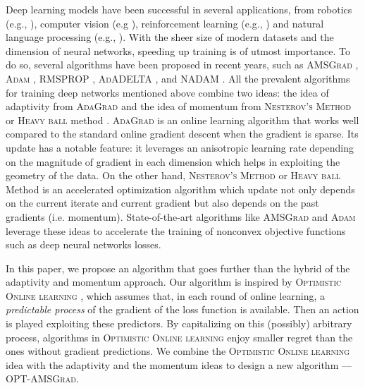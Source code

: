 \documentclass[twoside]{article}
\begin{document}
Deep learning models have been successful in several applications, from robotics (e.g., \citep{LFDA17}), computer vision (e.g \citep{Rnet16,goodfellow2014generative}), reinforcement learning (e.g., \citep{Atari13}) and natural language processing (e.g., \citep{GMH13}).
With the sheer size of modern datasets and the dimension of neural networks, speeding up training is of utmost importance.
To do so, several algorithms have been proposed in recent years, such as  \textsc{AMSGrad} \citep{RKK18}, \textsc{Adam} \citep{KB15}, \textsc{RMSPROP} \citep{TH12}, \textsc{AdADELTA} \citep{Z12}, and \textsc{NADAM} \citep{D16}.
All the prevalent algorithms for training deep networks mentioned above combine two ideas: the idea of adaptivity from \textsc{AdaGrad} \citep{DHS11,MS10} and the idea of momentum from \textsc{Nesterov's  Method} \citep{N04} or \textsc{Heavy ball} method \citep{P64}.
\textsc{AdaGrad} is an online learning algorithm that works well compared to the standard online gradient descent when the gradient is sparse.
Its update has a notable feature: it leverages an anisotropic learning rate depending on the magnitude of gradient in each dimension which helps in exploiting the geometry of the data. 
On the other hand, \textsc{Nesterov's Method} or \textsc{Heavy ball} Method \citep{P64} is an accelerated optimization algorithm which update not only depends on the current iterate and current gradient but also depends on the past gradients (i.e. momentum). 
State-of-the-art algorithms like \textsc{AMSGrad} \citep{RKK18} and \textsc{Adam} \citep{KB15} leverage these ideas to accelerate the training of nonconvex objective functions such as deep neural networks losses.

In this paper, we propose an algorithm that goes further than the hybrid of the adaptivity and momentum approach. 
Our algorithm is inspired by \textsc{Optimistic Online learning} \citep{CJ12,RS13b,SALS15,ALLW18,mertikopoulos2018optimistic}, which assumes that, in each round of online learning, a \emph{predictable process} of the gradient of the loss function is available. 
Then an action is played exploiting these predictors. 
By capitalizing on this (possibly) arbitrary process, algorithms in \textsc{Optimistic Online learning} enjoy smaller regret than the ones without gradient predictions.
We combine the \textsc{Optimistic Online learning} idea with the adaptivity and the momentum ideas to design a new algorithm --- \textsc{OPT-AMSGrad}. 
\end{document}
